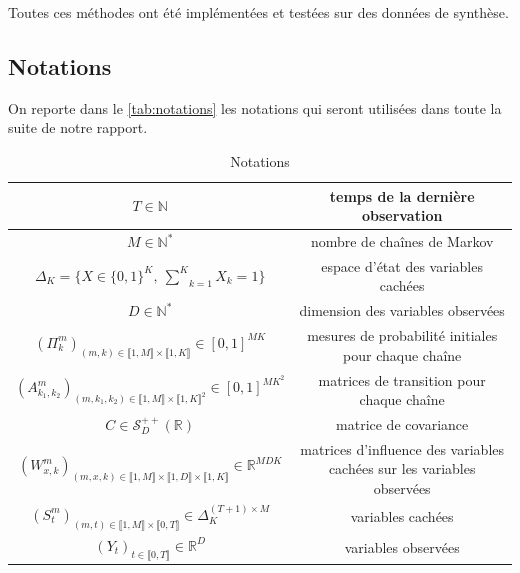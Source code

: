 \documentclass[10pt,a4paper]{article}
\begin{document}
Toutes ces méthodes ont été implémentées et testées sur des données de synthèse.

\subsection{Notations}

On reporte dans le \autoref{tab:notations} les notations qui seront utilisées
dans toute la suite de notre rapport.

\begin{table}[hpbt]

\begin{center}
  \begin{tabular}{|c|c|}
  \hline
  $T \in \mathbb{N}$ & temps de la dernière observation \\ \hline
  $M \in \mathbb{N}^*$ & nombre de chaînes de Markov \\ \hline
  $\Delta_K=\lbrace X \in \lbrace0,1\rbrace^K, \ 
  \underset{k=1}{\overset{K}{\sum}}X_k=1\rbrace$ & espace d'état des variables 
  cachées \\ \hline
  $D \in \mathbb{N}^*$ & dimension des variables observées \\ \hline
  $(\Pi_{k}^m)_{(m,k) \in \llbracket 1,M \rrbracket \times \llbracket 1,K 
  \rrbracket} \in [0,1]^{MK}$ & mesures de probabilité initiales pour chaque 
  chaîne \\ \hline
  $(A_{k_1,k_2}^m)_{(m,k_1,k_2) \in \llbracket 1,M \rrbracket \times \llbracket 
  1,K \rrbracket^2} \in [0,1]^{MK^2}$ & matrices de transition pour chaque chaîne 
   \\ \hline
  $C \in \mathcal{S}_D^{++}(\mathbb{R})$ & matrice de covariance \\ \hline
  $(W_{x,k}^m)_{(m,x,k) \in \llbracket 1,M \rrbracket \times \llbracket 1,D 
  \rrbracket \times \llbracket 1,K \rrbracket} \in \mathbb{R}^{MDK}$ & matrices 
  d'influence des variables cachées sur les variables observées \\ \hline
  $(S_t^m)_{(m,t) \in \llbracket 1,M \rrbracket \times \llbracket 0,T \rrbracket 
  } \in \Delta_K^{(T+1)\times M}$ & variables cachées \\ \hline
  $(Y_t)_{t \in \llbracket 0,T \rrbracket} \in \mathbb{R}^D$ & variables 
  observées \\ \hline
  \end{tabular}
  \caption{Notations\label{tab:notations}}
\end{center}
\end{table}
\end{document}
